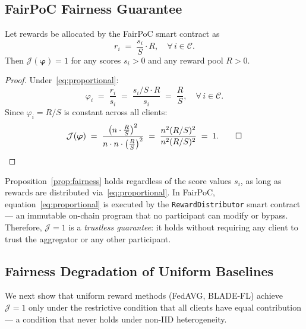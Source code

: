 \subsection{FairPoC Fairness Guarantee}

\begin{proposition}
\label{prop:fairness}
Let rewards be allocated by the FairPoC smart contract as
\begin{equation}
  r_i \;=\; \frac{s_i}{S} \cdot R, \quad \forall\, i \in \mathcal{C}.
  \label{eq:proportional}
\end{equation}
Then $\mathcal{J}(\boldsymbol{\varphi}) = 1$ for any scores
$s_i > 0$ and any reward pool $R > 0$.
\end{proposition}

\begin{proof}
Under~\eqref{eq:proportional}:
\[
  \varphi_i
  \;=\; \frac{r_i}{s_i}
  \;=\; \frac{s_i / S \cdot R}{s_i}
  \;=\; \frac{R}{S}, \quad \forall\, i \in \mathcal{C}.
\]
Since $\varphi_i = R/S$ is constant across all clients:
\[
  \mathcal{J}(\boldsymbol{\varphi})
  \;=\; \frac{\bigl(n \cdot \tfrac{R}{S}\bigr)^2}
             {n \cdot n \cdot \bigl(\tfrac{R}{S}\bigr)^2}
  \;=\; \frac{n^2 (R/S)^2}{n^2 (R/S)^2}
  \;=\; 1. \qed
\]
\end{proof}

\begin{remark}
Proposition~\ref{prop:fairness} holds regardless of the score
values $s_i$, as long as rewards are distributed
via~\eqref{eq:proportional}.
In FairPoC, equation~\eqref{eq:proportional} is executed by the
\texttt{RewardDistributor} smart contract — an immutable on-chain
program that no participant can modify or bypass.
Therefore, $\mathcal{J} = 1$ is a \emph{trustless guarantee}:
it holds without requiring any client to trust the aggregator
or any other participant.
\end{remark}

\subsection{Fairness Degradation of Uniform Baselines}

We next show that uniform reward methods (FedAVG, BLADE-FL)
achieve $\mathcal{J} = 1$ only under the restrictive condition
that all clients have equal contribution — a condition that never
holds under non-IID heterogeneity.

